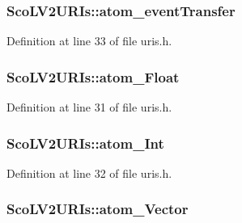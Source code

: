 \subsubsection[{\texorpdfstring{atom\+\_\+event\+Transfer}{atom_eventTransfer}}]{ Sco\+L\+V2\+U\+R\+Is\+::atom\+\_\+event\+Transfer}\hypertarget{struct_sco_l_v2_u_r_is_a84139547f83842b3c46d72b519f631d5}{}\label{struct_sco_l_v2_u_r_is_a84139547f83842b3c46d72b519f631d5}


Definition at line 33 of file uris.\+h.

\subsubsection[{\texorpdfstring{atom\+\_\+\+Float}{atom_Float}}]{ Sco\+L\+V2\+U\+R\+Is\+::atom\+\_\+\+Float}\hypertarget{struct_sco_l_v2_u_r_is_ae2503e43c71746a7b76e58868b7b5984}{}\label{struct_sco_l_v2_u_r_is_ae2503e43c71746a7b76e58868b7b5984}


Definition at line 31 of file uris.\+h.

\subsubsection[{\texorpdfstring{atom\+\_\+\+Int}{atom_Int}}]{ Sco\+L\+V2\+U\+R\+Is\+::atom\+\_\+\+Int}\hypertarget{struct_sco_l_v2_u_r_is_a273b116e5e97062888483d276a1d446a}{}\label{struct_sco_l_v2_u_r_is_a273b116e5e97062888483d276a1d446a}


Definition at line 32 of file uris.\+h.

\subsubsection[{\texorpdfstring{atom\+\_\+\+Vector}{atom_Vector}}]{ Sco\+L\+V2\+U\+R\+Is\+::atom\+\_\+\+Vector}\hypertarget{struct_sco_l_v2_u_r_is_ad24847b1e2792340b987409e8fa3bba4}{}\label{struct_sco_l_v2_u_r_is_ad24847b1e2792340b987409e8fa3bba4}


